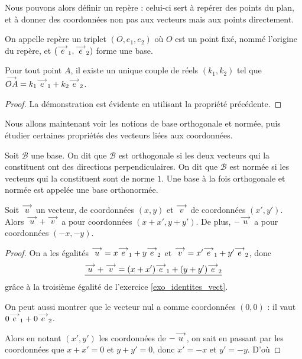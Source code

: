 Nous pouvons alors définir un repère : celui-ci sert à repérer des points du plan, et à donner des coordonnées non pas aux vecteurs mais aux points directement.

\begin{defi}
    On appelle repère un triplet $(O,e_1,e_2)$ où $O$ est un point fixé, nommé l'origine du repère, et $(\overset{\longrightarrow}{e}_1,\overset{\longrightarrow}{e}_2)$ forme une base.
\end{defi}

\begin{prop}
    Pour tout point $A$, il existe un unique couple de réels $(k_1,k_2)$ tel que $\overset{\longrightarrow}{OA}=k_1\overset{\longrightarrow}{e}_1 + k_2\overset{\longrightarrow}{e}_2$.
\end{prop}
\begin{proof}
    La démonstration est évidente en utilisant la propriété précédente.
\end{proof}

Nous allons maintenant voir les notions de base orthogonale et normée, puis étudier certaines propriétés des vecteurs liées aux coordonnées.

\begin{defi}
    Soit $\mathcal B$ une base. On dit que $\mathcal B$ est orthogonale si les deux vecteurs qui la constituent ont des directions perpendiculaires. On dit que $\mathcal B$ est normée si les vecteurs qui la constituent sont de norme $1$. Une base à la fois orthogonale et normée est appelée une base orthonormée.
\end{defi}

\begin{prop}
    Soit $\overset{\longrightarrow}{u}$ un vecteur, de coordonnées $(x,y)$ et $\overset{\longrightarrow}{v}$ de coordonnées $(x',y')$. Alors $\overset{\longrightarrow}{u} + \overset{\longrightarrow}{v}$ a pour coordonnées $(x+x',y+y')$. De plus, $-\overset{\longrightarrow}{u}$ a pour coordonnées $(-x,-y)$.
\end{prop}
\begin{proof}
    On a les égalités $\overset{\longrightarrow}{u} = x\overset{\longrightarrow}{e}_1 + y\overset{\longrightarrow}{e}_2$ et $\overset{\longrightarrow}{v} = x'\overset{\longrightarrow}{e}_1+y'\overset{\longrightarrow}{e}_2$, donc $$\underline{\overset{\longrightarrow}{u}+\overset{\longrightarrow}{v}=(x+x')\overset{\longrightarrow}{e}_1+(y+y')\overset{\longrightarrow}{e}_2}$$ grâce à la troisième égalité de l'exercice \ref{exo_identites_vect}.
    
    On peut aussi montrer que le vecteur nul a comme coordonnées $(0,0)$ : il vaut $0\overset{\longrightarrow}{e}_1+0\overset{\longrightarrow}{e}_2$.
    
    Alors en notant $(x',y')$ les coordonnées de $-\overset{\longrightarrow}{u}$, on sait en passant par les coordonnées que $x+x'=0$ et $y+y'=0$, donc $x'=-x$ et $y'=-y$. D'où 
\end{proof}

